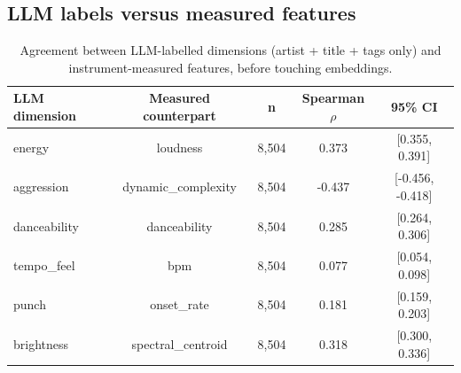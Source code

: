 \documentclass[11pt,a4paper]{article}
\begin{document}
\subsection*{LLM labels versus measured features}
\begin{table}[h]\centering\small
\begin{tabular}{lcccc}
\toprule
\textbf{LLM dimension} & \textbf{Measured counterpart} & \textbf{n} & \textbf{Spearman $\rho$} & \textbf{95\% CI} \\
\midrule
energy & loudness & 8,504 & 0.373 & [0.355, 0.391] \\
aggression & dynamic\_complexity & 8,504 & -0.437 & [-0.456, -0.418] \\
danceability & danceability & 8,504 & 0.285 & [0.264, 0.306] \\
tempo\_feel & bpm & 8,504 & 0.077 & [0.054, 0.098] \\
punch & onset\_rate & 8,504 & 0.181 & [0.159, 0.203] \\
brightness & spectral\_centroid & 8,504 & 0.318 & [0.300, 0.336] \\
\bottomrule
\end{tabular}
\caption{Agreement between LLM-labelled dimensions (artist + title + tags only) and instrument-measured features, before touching embeddings.}
\end{table}
\end{document}
